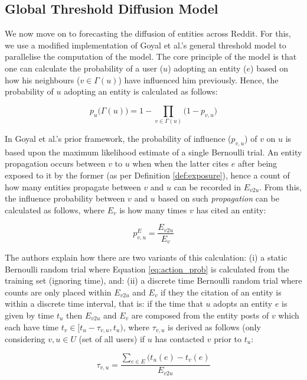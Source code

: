 \documentclass[journal,10pt,draftclsnofoot,onecolumn]{IEEEtran}
\begin{document}
\subsection{Global Threshold Diffusion Model}
We now move on to forecasting the diffusion of entities across Reddit.
For this, we use a modified implementation of Goyal et al.'s general threshold model \cite{goyal2010learning} to parallelise the computation of the model.
The core principle of the model is that one can calculate the probability of a user ($u$) adopting an entity ($e$) based on how his neighbours ($v \in \Gamma(u)$) have influenced him previously.
Hence, the probability of $u$ adopting an entity is calculated as follows:

\begin{equation}
\label{eq:joint_prob}
p_u\big(\Gamma(u)\big) = 1 - \displaystyle\prod_{v \in \Gamma(u)}\big(1 - p_{v,u}\big)
\end{equation}

In Goyal et al.'s prior framework, the probability of influence ($p_{v,u}$) of $v$ on $u$ is based upon the maximum likelihood estimate of a single Bernoulli trial.
An entity propagation occurs between $v$ to $u$ when when the latter cites $e$ after being exposed to it by the former (as per Definition \ref{def:exposure}), hence a count of how many entities propagate between $v$ and $u$ can be recorded in $E_{v2u}$.
From this, the influence probability between $v$ and $u$ based on such \emph{propagation} can be calculated as follows, where $E_v$ is how many times $v$ has cited an entity:

\begin{equation}
\label{eq:action_prob}
p^{E}_{v,u} = \frac{E_{v2u}}{E_v}
\end{equation}

The authors explain how there are two variants of this calculation: (i) a static Bernoulli random trial where Equation \ref{eq:action_prob} is calculated from the training set (ignoring time), and: (ii) a discrete time Bernoulli random trial where counts are only placed within $E_{v2u}$ and $E_v$ if they the citation of an entity is within a discrete time interval, that is: if the time that $u$ adopts an entity $e$ is given by time $t_u$ then $E_{v2u}$ and $E_v$ are composed from the entity posts of $v$ which each have time $t_v \in [t_u - \tau_{v,u}, t_u)$, where $\tau_{v,u}$ is derived as follows (only considering $v, u \in U$ (set of all users) if $u$ has contacted $v$ prior to $t_u$:

\begin{equation}
\tau_{v,u} = \frac{\displaystyle\sum_{e \in E} (t_u(e) - t_v(e)}{E_{v2u}}
\end{equation}
\end{document}
